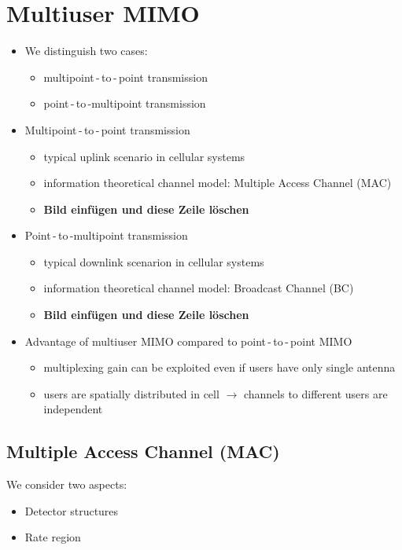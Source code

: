 \documentclass[a4paper, 10pt]{article}
\begin{document}
\setcounter{section}{2}
\section{Multiuser MIMO}
\begin{itemize}
	\item We distinguish two cases:
	\begin{itemize}
		\item multipoint\,-\,to\,-\,point transmission
		\item point\,-\,to\,-multipoint transmission
	\end{itemize}
	\item Multipoint\,-\,to\,-\,point transmission
	\begin{itemize}
		\item typical uplink scenario in cellular systems
		\item information theoretical channel model: Multiple Access Channel (MAC)
		\item \textbf{Bild einf\"ugen und diese Zeile l\"oschen}
	\end{itemize}
	\item Point\,-\,to\,-multipoint transmission
	\begin{itemize}
		\item typical downlink scenarion in cellular systems
		\item information theoretical channel model: Broadcast Channel (BC)
		\item \textbf{Bild einf\"ugen und diese Zeile l\"oschen}
	\end{itemize}
	\item Advantage of multiuser MIMO compared to point\,-\,to\,-\,point MIMO
	\begin{itemize}
		\item multiplexing gain can be exploited even if users have only single antenna
		\item users are spatially distributed in cell $\rightarrow $ channels to different users are independent
	\end{itemize}
\end{itemize}
\subsection{Multiple Access Channel (MAC)}
We consider two aspects:
\begin{itemize}
	\item Detector structures
	\item Rate region
\end{itemize}
\end{document}
